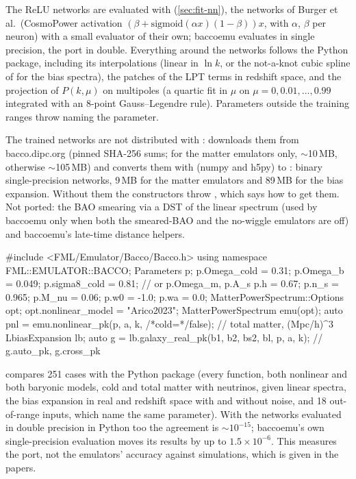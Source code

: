 \begin{implementation}
The ReLU networks are evaluated with  (\cref{sec:fit-nn}), the networks of Burger et al.\ (CosmoPower
activation $(\beta+\mathrm{sigmoid}(\alpha x)(1-\beta))x$, with $\alpha$, $\beta$ per neuron) with a small evaluator of their
own; baccoemu evaluates in single precision, the port in double. Everything around the networks follows the Python package,
including its interpolations (linear in $\ln k$, or the not-a-knot cubic spline of  for the
bias spectra), the patches of the LPT terms in redshift space, and the projection of $P(k,\mu)$ on multipoles (a quartic fit
in $\mu$ on $\mu=0,0.01,\ldots,0.99$ integrated with an 8-point Gauss--Legendre rule). Parameters outside the training
ranges throw  naming the parameter.

The trained networks are not distributed with \fml{}:  downloads them from bacco.dipc.org
(pinned SHA-256 sums;  for the matter emulators only, $\sim$10\,MB, otherwise $\sim$105\,MB) and converts
them with  (numpy and h5py) to : binary single-precision networks, 9\,MB for the matter
emulators and 89\,MB for the bias expansion. Without them the constructors throw , which says how to
get them. Not ported: the BAO smearing via a DST of the linear spectrum (used by baccoemu only when both the smeared-BAO
and the no-wiggle emulators are off) and baccoemu's late-time distance helpers.
\end{implementation}

\begin{cppcode}
#include <FML/Emulator/Bacco/Bacco.h>
using namespace FML::EMULATOR::BACCO;
Parameters p;
p.Omega_cold = 0.31; p.Omega_b = 0.049; p.sigma8_cold = 0.81;   // or p.Omega_m, p.A_s
p.h = 0.67; p.n_s = 0.965; p.M_nu = 0.06; p.w0 = -1.0; p.wa = 0.0;
MatterPowerSpectrum::Options opt;
opt.nonlinear_model = "Arico2023";
MatterPowerSpectrum emu(opt);
auto pnl = emu.nonlinear_pk(p, a, k, /*cold=*/false);     // total matter, (Mpc/h)^3
LbiasExpansion lb;
auto g = lb.galaxy_real_pk({b1, b2, bs2, bl}, p, a, k);    // g.auto_pk, g.cross_pk
\end{cppcode}

\begin{validation}
 compares 251 cases with the Python package (every function, both nonlinear and both baryonic
models, cold and total matter with neutrinos, given linear spectra, the bias expansion in real and redshift space with and
without noise, and 18 out-of-range inputs, which name the same parameter). With the networks evaluated in double precision
in Python too the agreement is $\sim10^{-15}$; baccoemu's own single-precision evaluation moves its results by up to
$1.5\times10^{-6}$. This measures the port, not the emulators' accuracy against simulations, which is given in the papers.
\end{validation}

